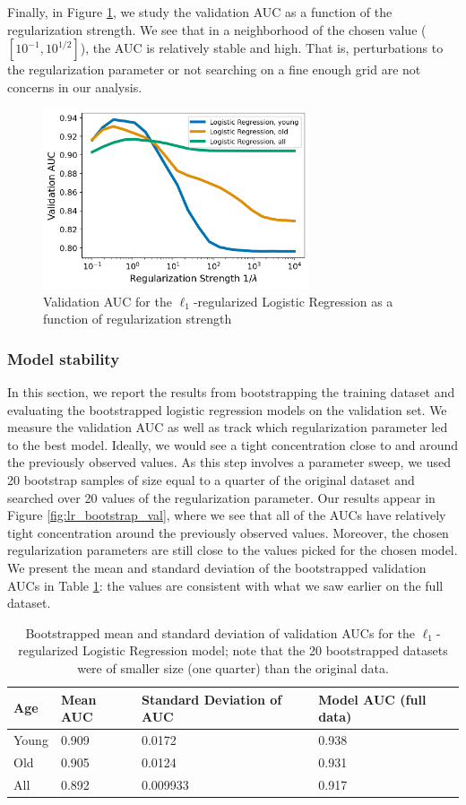 \documentclass[11pt, letterpaper]{amsart}
\let\Oldsubsubsection\subsubsection
\renewcommand{\subsubsection}{\FloatBarrier\Oldsubsubsection}
\begin{document}
Finally, in Figure \ref{fig:lr_lambda_auc}, we study the validation AUC as a function of the regularization strength. We see that in a neighborhood of the chosen value ($[10^{-1}, 10^{1/2}]$), the AUC is relatively stable and high. That is, perturbations to the regularization parameter or not searching on a fine enough grid are not concerns in our analysis. 
\begin{figure}
	\centering
	\includegraphics[width=0.7\textwidth]{lr_auc_lambda.png}
	\caption{Validation AUC for the $\ell_1$-regularized Logistic Regression as a function of regularization strength}\label{fig:lr_lambda_auc}
\end{figure}

\subsubsection{Model stability}

In this section, we report the results from bootstrapping the training dataset and evaluating the bootstrapped logistic regression models on the validation set. We measure the validation AUC as well as track which regularization parameter led to the best model. Ideally, we would see a tight concentration close to and around the previously observed values. As this step involves a parameter sweep, we used 20 bootstrap samples of size equal to a quarter of the original dataset and searched over 20 values of the regularization parameter. Our results appear in Figure \ref{fig:lr_bootstrap_val}, where we see that all of the AUCs have relatively tight concentration around the previously observed values. Moreover, the chosen regularization parameters are still close to the values picked for the chosen model. We present the mean and standard deviation of the bootstrapped validation AUCs in Table \ref{tab:bs_auc}: the values are consistent with what we saw earlier on the full dataset. 
\begin{table}[h]
\begin{tabular}{llll}
Age & Mean AUC & Standard Deviation of AUC & Model AUC (full data) \\
\hline
Young & 0.909 & 0.0172 & 0.938 \\
Old & 0.905 & 0.0124 & 0.931 \\
All & 0.892 & 0.009933 & 0.917 
\end{tabular}
\caption{Bootstrapped mean and standard deviation of validation AUCs for the $\ell_1$-regularized Logistic Regression model; note that the 20 bootstrapped datasets were of smaller size (one quarter) than the original data.}\label{tab:bs_auc}
\end{table}
\end{document}
